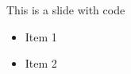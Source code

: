 \begin{frame}{This is a slide with code}
 \begin{itemize}
 \item Item 1
 \item Item 2
 \end{itemize}
 \inputminted{bash}{example-script.sh}
\end{frame}
